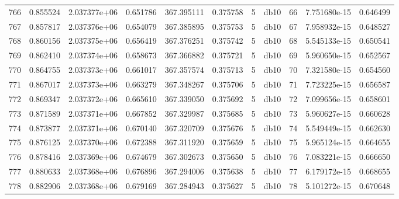\begin{tabular}{lrrrrrrlrrr}
766  &    0.855524 &        2.037377e+06 &  0.651786 &              367.395111 &    0.375758 &       5 &         db10 &     66 &   7.751680e-15 &      0.646499 \\
767  &    0.857817 &        2.037376e+06 &  0.654079 &              367.385895 &    0.375753 &       5 &         db10 &     67 &   7.958932e-15 &      0.648527 \\
768  &    0.860156 &        2.037375e+06 &  0.656419 &              367.376251 &    0.375742 &       5 &         db10 &     68 &   5.545133e-15 &      0.650541 \\
769  &    0.862410 &        2.037374e+06 &  0.658673 &              367.366882 &    0.375721 &       5 &         db10 &     69 &   5.960650e-15 &      0.652567 \\
770  &    0.864755 &        2.037373e+06 &  0.661017 &              367.357574 &    0.375713 &       5 &         db10 &     70 &   7.321580e-15 &      0.654560 \\
771  &    0.867017 &        2.037373e+06 &  0.663279 &              367.348267 &    0.375706 &       5 &         db10 &     71 &   7.723225e-15 &      0.656587 \\
772  &    0.869347 &        2.037372e+06 &  0.665610 &              367.339050 &    0.375692 &       5 &         db10 &     72 &   7.099656e-15 &      0.658601 \\
773  &    0.871589 &        2.037371e+06 &  0.667852 &              367.329987 &    0.375685 &       5 &         db10 &     73 &   5.960627e-15 &      0.660628 \\
774  &    0.873877 &        2.037371e+06 &  0.670140 &              367.320709 &    0.375676 &       5 &         db10 &     74 &   5.549449e-15 &      0.662630 \\
775  &    0.876125 &        2.037370e+06 &  0.672388 &              367.311920 &    0.375659 &       5 &         db10 &     75 &   5.965124e-15 &      0.664655 \\
776  &    0.878416 &        2.037369e+06 &  0.674679 &              367.302673 &    0.375650 &       5 &         db10 &     76 &   7.083221e-15 &      0.666650 \\
777  &    0.880633 &        2.037368e+06 &  0.676896 &              367.294006 &    0.375638 &       5 &         db10 &     77 &   6.179172e-15 &      0.668655 \\
778  &    0.882906 &        2.037368e+06 &  0.679169 &              367.284943 &    0.375627 &       5 &         db10 &     78 &   5.101272e-15 &      0.670648 \\

\end{tabular}
